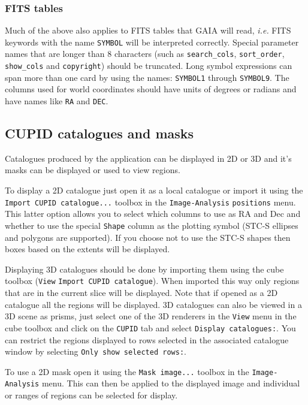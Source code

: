 \documentclass[twoside,11pt,nolof]{starlink}
\providecommand{\mytt}[1]{{\texttt{#1}}}
\begin{document}
\subsubsection{FITS tables}

Much of the above also applies to FITS tables that GAIA will read,
\textit{i.e.} FITS keywords with the name \mytt{SYMBOL} will be interpreted
correctly. Special parameter names that are longer than 8 characters (such as
\mytt{search\_cols}, \mytt{sort\_order}, \mytt{show\_cols} and
\mytt{copyright}) should be truncated. Long symbol expressions can span more
than one card by using the names: \mytt{SYMBOL1} through \mytt{SYMBOL9}. The
columns used for world coordinates should have units of degrees or radians and
have names like \mytt{RA} and \mytt{DEC}.

\subsection{CUPID catalogues and masks}

Catalogues produced by the  application can be displayed
in 2D or 3D and it's masks can be displayed or used to view regions.

To display a 2D catalogue just open it as a local catalogue or import it
using the \mytt{Import CUPID catalogue...} toolbox in the \mytt{Image-Analysis}
\mytt{positions} menu. This latter option allows you to select which columns
to use as RA and Dec and whether to use the special \mytt{Shape} column as the
plotting symbol (STC-S ellipses and polygons are supported). If you choose not
to use the STC-S shapes then boxes based on the extents will be displayed.

Displaying 3D catalogues should be done by importing them using the cube
toolbox (\mytt{View} \mytt{Import CUPID catalogue}). When imported this way
only regions that are in the current slice will be displayed. Note that if
opened as a 2D catalogue all the regions will be displayed. 3D catalogues can
also be viewed in a 3D scene as prisms, just select one of the 3D renderers in
the \mytt{View} menu in the cube toolbox and click on the \mytt{CUPID} tab and
select \mytt{Display catalogues:}. You can restrict the regions displayed to
rows selected in the associated catalogue window by selecting \mytt{Only show
selected rows:}.

To use a 2D mask open it using the \mytt{Mask image...} toolbox in the
\mytt{Image-Analysis} menu. This can then be applied to the displayed image
and individual or ranges of regions can be selected for display.
\end{document}
